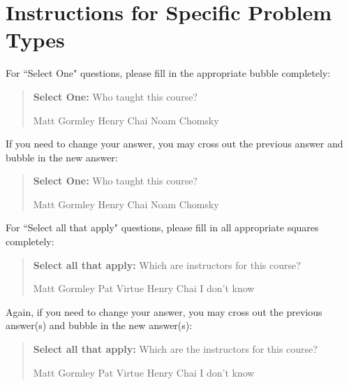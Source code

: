 \documentclass[11pt,addpoints,answers]{exam}
\newcommand{\blackcircle}{\tikz\draw[black,fill=black] (0,0) circle (1ex);}
\begin{document}
\clearpage

\section*{Instructions for Specific Problem Types}

For ``Select One" questions, please fill in the appropriate bubble completely:

\begin{quote}
\textbf{Select One:} Who taught this course?
    \begin{checkboxes}
     \CorrectChoice Matt Gormley
     \choice Henry Chai
     \choice Noam Chomsky
    \end{checkboxes}
\end{quote}

If you need to change your answer, you may cross out the previous answer and bubble in the new answer:

\begin{quote}
\textbf{Select One:} Who taught this course?
    {
    \begin{checkboxes}
     \CorrectChoice Matt Gormley
     \choice Henry Chai \checkboxchar{\xcancel{\blackcircle}{}}
     \choice Noam Chomsky
    \end{checkboxes}
    }
\end{quote}

For ``Select all that apply" questions, please fill in all appropriate squares completely:

\begin{quote}
\textbf{Select all that apply:} Which are instructors for this course?
    {%
    \checkboxchar{$\Box$} \checkedchar{$\blacksquare$} %
    \begin{checkboxes}
    \CorrectChoice Matt Gormley  
    \CorrectChoice Pat Virtue
    \choice Henry Chai
    \choice I don't know
    \end{checkboxes}
    }
\end{quote}

Again, if you need to change your answer, you may cross out the previous answer(s) and bubble in the new answer(s):

\begin{quote}
\textbf{Select all that apply:} Which are the instructors for this course?
    {%
    \checkboxchar{\xcancel{$\blacksquare$}} \checkedchar{$\blacksquare$} %
    \begin{checkboxes}
    \CorrectChoice Matt Gormley 
    \CorrectChoice Pat Virtue
    \choice Henry Chai
    \choice I don't know
    \end{checkboxes}
    }
\end{quote}
\end{document}
